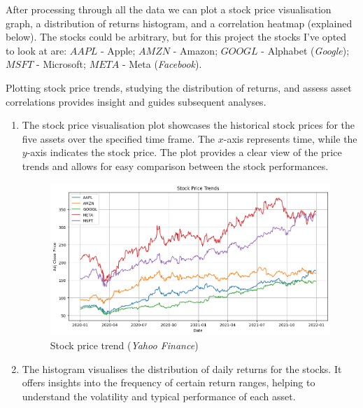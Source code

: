 \documentclass[a4paper,12pt,titlepage]{article}
\numberwithin{equation}{section}
\begin{document}
	After processing through all the data we can plot a stock price visualisation graph, a distribution of returns histogram,
	and a correlation heatmap (explained below). The stocks could be arbitrary, but for this project the stocks
	I've opted to look at are: $AAPL$ - Apple; $AMZN$ - Amazon; $GOOGL$ - Alphabet (\textit{Google}); 
	$MSFT$ - Microsoft; $META$ - Meta (\textit{Facebook}). \newline \par \noindent Plotting stock price trends, studying 
	the distribution of returns, and assess asset correlations provides insight and guides subsequent analyses.

	\newpage
	\begin{enumerate}

		\item The stock price visualisation plot showcases the historical stock prices for the five 
			assets over the specified time frame. The $x$-axis represents time, while the 
			$y$-axis indicates the stock price. The plot provides a clear view of the price trends 
			and allows for easy comparison between the stock performances.

			\begin{figure}[htbp] %
				\centering
				\includegraphics[width=0.8\linewidth,keepaspectratio]{Plots/StockPriceVisual.png}
				\caption{Stock price trend (\textit{Yahoo Finance})}
				\label{fig:figure1}
			  \end{figure}
			  

		\item The histogram visualises the distribution of daily returns 
			for the stocks. It offers insights into the frequency of certain return ranges, helping 
			to understand the volatility and typical performance of each asset.


\end{enumerate}
\end{document}
